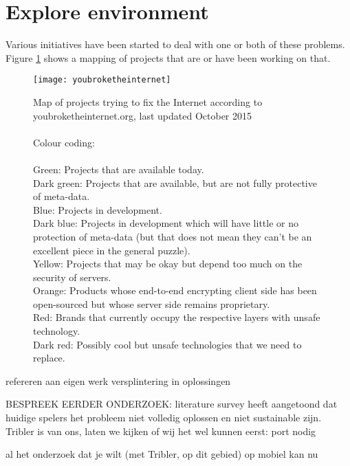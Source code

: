 \section{Explore environment}

Various initiatives have been started to deal with one or both of these problems.
Figure \ref{fig:youbroketheinternet} shows a mapping of projects that are or have been working on that.
\\
\begin{figure}[h]
	\centering
	\texttt{[image: youbroketheinternet]}
	\caption{Map of projects trying to fix the Internet according to youbroketheinternet.org, last updated October 2015\\
		\\
		Colour coding:\\
		\\
		\textcolor[RGB]{51,204,51}{Green:} Projects that are available today.\\
		\textcolor[RGB]{86,149,38}{Dark green:} Projects that are available, but are not fully protective of meta-data.\\
		\textcolor[RGB]{89,204,255}{Blue:} Projects in development.\\
		\textcolor[RGB]{17,153,211}{Dark blue:} Projects in development which will have little or no protection of meta-data (but that does not mean they can't be an excellent piece in the general puzzle).\\
		\textcolor[RGB]{226,228,27}{Yellow:} Projects that may be okay but depend too much on the security of servers.\\
		\textcolor[RGB]{255,153,51}{Orange:} Products whose end-to-end encrypting client side has been open-sourced but whose server side remains proprietary.\\
		\textcolor[RGB]{225,77,93}{Red:} Brands that currently occupy the respective layers with unsafe technology.\\
		\textcolor[RGB]{155,35,25}{Dark red:} Possibly cool but unsafe technologies that we need to replace.}
	\label{fig:youbroketheinternet}
\end{figure}

refereren aan eigen werk versplintering in oplossingen


BESPREEK EERDER ONDERZOEK: literature survey heeft aangetoond dat huidige spelers het probleem niet volledig oplossen en niet sustainable zijn.
Tribler is van ons, laten we kijken of wij het wel kunnen
eerst: port nodig


al het onderzoek dat je wilt (met Tribler, op dit gebied) op mobiel kan nu
